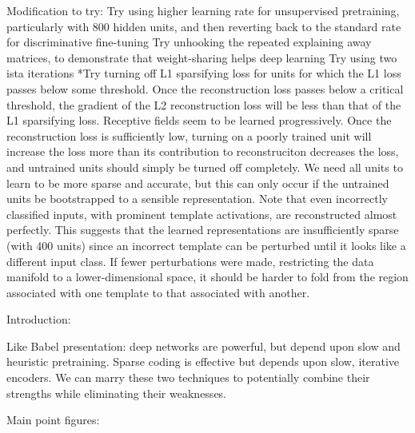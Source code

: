 Modification to try:
Try using higher learning rate for unsupervised pretraining, particularly with 800 hidden units, and then reverting back to the standard rate for discriminative fine-tuning
Try unhooking the repeated explaining away matrices, to demonstrate that weight-sharing helps deep learning
Try using two ista iterations
*Try turning off L1 sparsifying loss for units for which the L1 loss passes below some threshold.  Once the reconstruction loss passes below a critical threshold, the gradient of the L2 reconstruction loss will be less than that of the L1 sparsifying loss.  Receptive fields seem to be learned progressively.  Once the reconstruction loss is sufficiently low, turning on a poorly trained unit will increase the loss more than its contribution to reconstruciton decreases the loss, and untrained units should simply be turned off completely.  We need all units to learn to be more sparse and accurate, but this can only occur if the untrained units be bootstrapped to a sensible representation.  
Note that even incorrectly classified inputs, with prominent template activations, are reconstructed almost perfectly.  This suggests that the learned representations are insufficiently sparse (with 400 units) since an incorrect template can be perturbed until it looks like a different input class.  If fewer perturbations were made, restricting the data manifold to a lower-dimensional space, it should be harder to fold from the region associated with one template to that associated with another.


Introduction:

Like Babel presentation: deep networks are powerful, but depend upon slow and heuristic pretraining.  Sparse coding is effective but depends upon slow, iterative encoders.  We can marry these two techniques to potentially combine their strengths while eliminating their weaknesses.


Main point figures:

